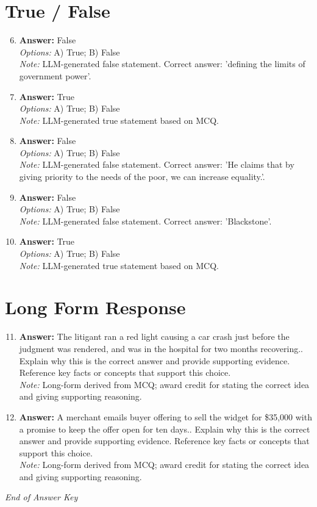 \documentclass[12pt]{article}
\begin{document}
\section*{True / False}
\begin{enumerate}[label=\arabic*.]
\setcounter{enumi}{5}
\item \textbf{Answer:} False
\\ \textit{Options:} A) True; B) False
\\ \textit{Note:} LLM-generated false statement. Correct answer: 'defining the limits of government power'.
\item \textbf{Answer:} True
\\ \textit{Options:} A) True; B) False
\\ \textit{Note:} LLM-generated true statement based on MCQ.
\item \textbf{Answer:} False
\\ \textit{Options:} A) True; B) False
\\ \textit{Note:} LLM-generated false statement. Correct answer: 'He claims that by giving priority to the needs of the poor, we can increase equality.'.
\item \textbf{Answer:} False
\\ \textit{Options:} A) True; B) False
\\ \textit{Note:} LLM-generated false statement. Correct answer: 'Blackstone'.
\item \textbf{Answer:} True
\\ \textit{Options:} A) True; B) False
\\ \textit{Note:} LLM-generated true statement based on MCQ.
\end{enumerate}

\section*{Long Form Response}
\begin{enumerate}[label=\arabic*.]
\setcounter{enumi}{10}
\item \textbf{Answer:} The litigant ran a red light causing a car crash just before the judgment was rendered, and was in the hospital for two months recovering.. Explain why this is the correct answer and provide supporting evidence. Reference key facts or concepts that support this choice.
\\ \textit{Note:} Long-form derived from MCQ; award credit for stating the correct idea and giving supporting reasoning.
\item \textbf{Answer:} A merchant emails buyer offering to sell the widget for \$35,000 with a promise to keep the offer open for ten days.. Explain why this is the correct answer and provide supporting evidence. Reference key facts or concepts that support this choice.
\\ \textit{Note:} Long-form derived from MCQ; award credit for stating the correct idea and giving supporting reasoning.
\end{enumerate}

\vfill
\noindent\textit{End of Answer Key}
\end{document}
